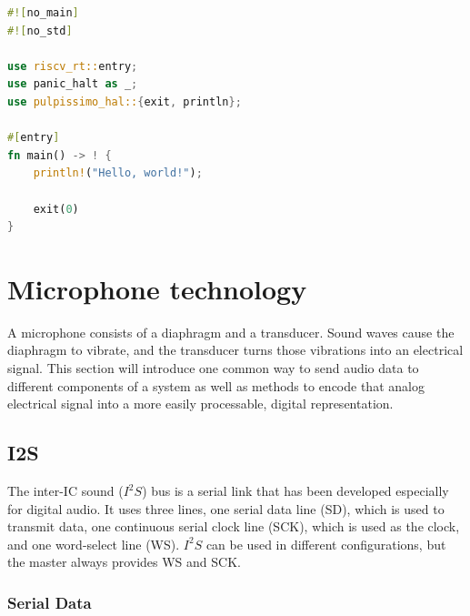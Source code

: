 \begin{minipage}{\textwidth}
\begin{lstlisting}[style=colorEX,language=Rust,caption={Minimal example of a program running on the pulpissimo hardware},label={code:min_example}]
#![no_main]
#![no_std]

use riscv_rt::entry;
use panic_halt as _;
use pulpissimo_hal::{exit, println};

#[entry]
fn main() -> ! {
    println!("Hello, world!");

    exit(0)
}
\end{lstlisting}
\end{minipage}


\section{Microphone technology}

A microphone consists of a diaphragm and a transducer.
Sound waves cause the diaphragm to vibrate, and
the transducer turns those vibrations into an electrical signal.
This section will introduce one common way to send audio data to different
components of a system as well as methods to encode that analog electrical
signal into a more easily processable, digital representation.

\subsection{I2S}

The inter-IC sound ($I^2S$) \cite{i2s} bus is a serial link that has been developed especially for digital audio.
It uses three lines, one serial data line (SD), which is used to transmit data, one continuous serial clock line (SCK),
which is used as the clock, and one word-select line (WS).
$I^2S$ can be used in different configurations, but the master always provides WS and SCK.

\subsubsection{Serial Data}

